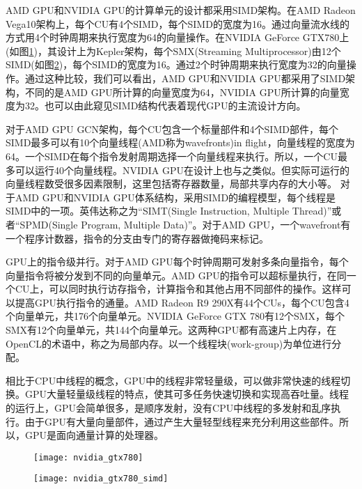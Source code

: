 AMD GPU和NVIDIA GPU的计算单元的设计都采用SIMD架构。在AMD Radeon Vega10架构上，每个CU有4个SIMD，每个SIMD的宽度为16。通过向量流水线的方式用4个时钟周期来执行宽度为64的向量操作。在NVIDIA GeForce GTX780上(如图\ref{fig:nvidia_gtx780})，其设计上为Kepler架构，每个SMX(Streaming Multiprocessor)由12个SIMD(如图\ref{fig:nvidia_gtx780_simd})，每个SIMD的宽度为16。通过2个时钟周期来执行宽度为32的向量操作。通过这种比较，我们可以看出，AMD GPU和NVIDIA GPU都采用了SIMD架构，不同的是AMD GPU所计算的向量宽度为64，NVIDIA GPU所计算的向量宽度为32。也可以由此窥见SIMD结构代表着现代GPU的主流设计方向。

对于AMD GPU GCN架构，每个CU包含一个标量部件和4个SIMD部件，每个SIMD最多可以有10个向量线程(AMD称为wavefronts)in flight，向量线程的宽度为64。一个SIMD在每个指令发射周期选择一个向量线程来执行。所以，一个CU最多可以运行40个向量线程。NVIDIA GPU在设计上也与之类似。但实际可运行的向量线程数受很多因素限制，这里包括寄存器数量，局部共享内存的大小等。
对于AMD GPU和NVIDIA GPU体系结构，采用SIMD的编程模型，每个线程是SIMD中的一项。英伟达称之为“SIMT(Single Instruction, Multiple Thread)”或者“SPMD(Single Program, Multiple Data)”。对于AMD GPU，一个wavefront有一个程序计数器，指令的分支由专门的寄存器做掩码来标记。

GPU上的指令级并行。对于AMD GPU每个时钟周期可发射多条向量指令，每个向量指令将被分发到不同的向量单元。AMD GPU的指令可以超标量执行，在同一个CU上，可以同时执行访存指令，计算指令和其他占用不同部件的操作。这样可以提高GPU执行指令的通量。AMD Radeon R9 290X有44个CUs，每个CU包含4个向量单元，共176个向量单元。NVIDIA GeForce GTX 780有12个SMX，每个SMX有12个向量单元，共144个向量单元。这两种GPU都有高速片上内存，在OpenCL的术语中，称之为局部内存。以一个线程块(work-group)为单位进行分配。

相比于CPU中线程的概念，GPU中的线程非常轻量级，可以做非常快速的线程切换。GPU大量轻量级线程的特点，使其可多任务快速切换和实现高吞吐量。线程的运行上，GPU会简单很多，是顺序发射，没有CPU中线程的多发射和乱序执行。由于GPU有大量向量部件，通过产生大量轻型线程来充分利用这些部件。所以，GPU是面向通量计算的处理器。
\begin{figure}[htbp]
	\centering
	\texttt{[image: nvidia\_gtx780]}
	\label{fig:nvidia_gtx780}
\end{figure}

\begin{figure}[htbp]
	\centering
	\texttt{[image: nvidia\_gtx780\_simd]}
	\label{fig:nvidia_gtx780_simd}
\end{figure}

